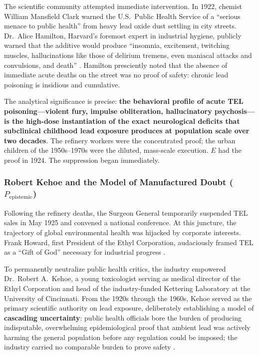 The scientific community attempted immediate intervention. In 1922, chemist William Mansfield Clark warned the U.S.\ Public Health Service of a ``serious menace to public health'' from heavy lead oxide dust settling in city streets. Dr.\ Alice Hamilton, Harvard's foremost expert in industrial hygiene, publicly warned that the additive would produce ``insomnia, excitement, twitching muscles, hallucinations like those of delirium tremens, even maniacal attacks and convulsions, and death'' \cite{tel_hamilton}. Hamilton presciently noted that the absence of immediate acute deaths on the street was no proof of safety: chronic lead poisoning is insidious and cumulative.

The analytical significance is precise: \textbf{the behavioral profile of acute TEL poisoning---violent fury, impulse obliteration, hallucinatory psychosis---is the high-dose instantiation of the exact neurological deficits that subclinical childhood lead exposure produces at population scale over two decades}. The refinery workers were the concentrated proof; the urban children of the 1950s--1970s were the diluted, mass-scale execution. $E$ had the proof in 1924. The suppression began immediately.

\subsubsection{Robert Kehoe and the Model of Manufactured Doubt (\texorpdfstring{$P_{\text{epistemic}}$}{P\_epistemic})}

Following the refinery deaths, the Surgeon General temporarily suspended TEL sales in May 1925 and convened a national conference. At this juncture, the trajectory of global environmental health was hijacked by corporate interests. Frank Howard, first President of the Ethyl Corporation, audaciously framed TEL as a ``Gift of God'' necessary for industrial progress \cite{tel_kehoe}.

To permanently neutralize public health critics, the industry empowered Dr.\ Robert A.\ Kehoe, a young toxicologist serving as medical director of the Ethyl Corporation and head of the industry-funded Kettering Laboratory at the University of Cincinnati. From the 1920s through the 1960s, Kehoe served as the primary scientific authority on lead exposure, deliberately establishing a model of \textbf{cascading uncertainty}: public health officials bore the burden of producing indisputable, overwhelming epidemiological proof that ambient lead was actively harming the general population before any regulation could be imposed; the industry carried no comparable burden to prove safety \cite{tel_kehoe, tel_secret_history}.

